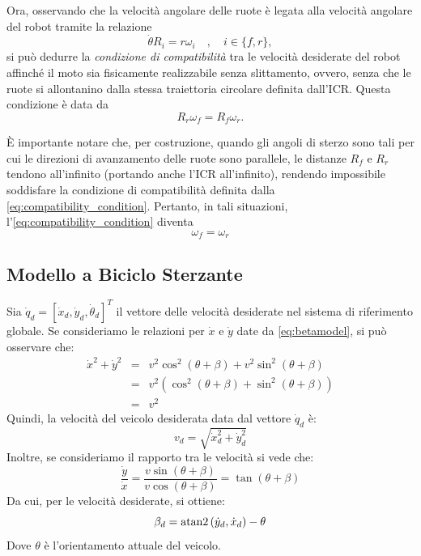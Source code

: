 Ora, osservando che la velocità angolare delle ruote è legata alla velocità angolare del robot tramite la relazione
\begin{equation}\label{eq:omega_relation}
    \dot{\theta} R_i = r \omega_i \quad , \quad i \in \{f,r\},
\end{equation}
si può dedurre la \textit{condizione di compatibilità} tra le velocità desiderate del robot affinché il moto sia fisicamente realizzabile senza slittamento, ovvero, senza che le ruote si allontanino dalla stessa traiettoria circolare definita dall'ICR. Questa condizione è data da
\begin{equation}\label{eq:compatibility_condition}
    R_r \omega_f = R_f \omega_r.
\end{equation}
\begin{note}
    È importante notare che, per costruzione, quando gli angoli di sterzo sono tali per cui le direzioni di avanzamento delle ruote sono parallele, le distanze $R_f$ e $R_r$ tendono all'infinito (portando anche l'ICR all'infinito), rendendo impossibile soddisfare la condizione di compatibilità definita dalla \cref{eq:compatibility_condition}. Pertanto, in tali situazioni, l'\cref{eq:compatibility_condition} diventa
    \begin{equation}\label{eq:comp_cond_inf}
        \omega_f = \omega_r
    \end{equation}
\end{note}
\subsection{Modello a Biciclo Sterzante}
Sia $\dot{q}_d = [\dot{x}_d, \dot{y}_d, \dot{\theta}_d]^T$ il vettore delle velocità desiderate nel sistema di riferimento globale. Se consideriamo le relazioni per $\dot{x}$ e $\dot{y}$ date da \cref{eq:betamodel}, si può osservare che:
\begin{eqnarray*}
    \dot{x}^2 + \dot{y}^2 & = & v^2 \cos^2(\theta + \beta) + v^2 \sin^2(\theta + \beta) \\
    & = & v^2 (\cos^2(\theta + \beta) + \sin^2(\theta + \beta)) \\
    & = & v^2
\end{eqnarray*}
Quindi, la velocità del veicolo desiderata data dal vettore $\dot{q}_d$ è:
\begin{equation}\label{eq:vd_magnitude}
    v_d = \sqrt{\dot{x}_d^2 + \dot{y}_d^2}
\end{equation}
Inoltre, se consideriamo il rapporto tra le velocità si vede che:
\begin{equation*}
    \frac{\dot{y}}{\dot{x}} = \frac{v \sin(\theta + \beta)}{v \cos(\theta + \beta)} = \tan(\theta + \beta)
\end{equation*}
Da cui, per le velocità desiderate, si ottiene:
\begin{equation}\label{eq:beta_des}
    \beta_d = \operatorname{atan2}\left(\dot{y}_d,\dot{x}_d\right) - \theta
\end{equation}
Dove $\theta$ è l'orientamento attuale del veicolo.


